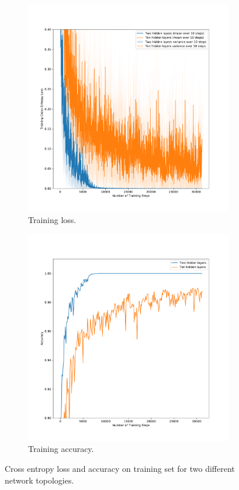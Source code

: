\begin{figure}[h!]
  \centering
  \begin{subfigure}[b]{0.49\textwidth}
    \includegraphics[clip, trim=1cm 0cm 1cm 0cm, width=\textwidth]{figures/Task4e_loss.pdf}
    \caption{Training loss.}
  \end{subfigure}
  \hfill
  \begin{subfigure}[b]{0.49\textwidth}
    \includegraphics[clip, trim=1cm 0cm 1cm 0cm, width=\textwidth]{figures/Task4e_accuracy.pdf}
    \caption{Training accuracy.}
  \end{subfigure}
  \caption{Cross entropy loss and accuracy on training set for two different network topologies.}
  \label{fig:task4:e}
\end{figure}
